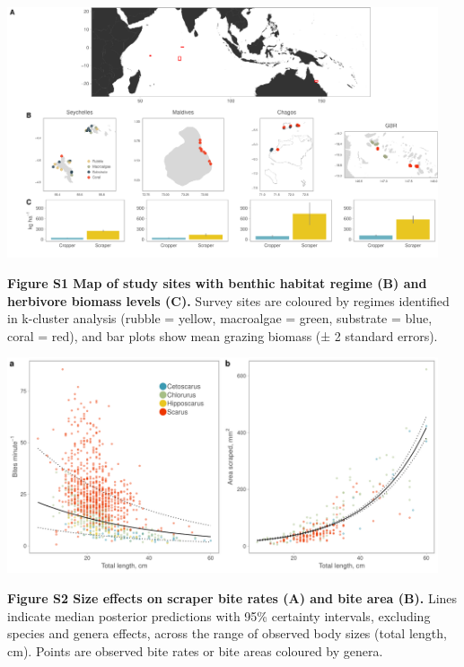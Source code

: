 \documentclass[12pt,]{article}
\begin{document}
~

\begin{center}\includegraphics[width=480px]{../../figures/Figure1} \end{center}

\textbf{Figure S1 \textbar{} Map of study sites with benthic habitat
regime (B) and herbivore biomass levels (C).} Survey sites are coloured
by regimes identified in k-cluster analysis (rubble = yellow, macroalgae
= green, substrate = blue, coral = red), and bar plots show mean grazing
biomass (± 2 standard errors).

\newpage

\begin{center}\includegraphics[width=480px]{../../figures/FigureS1_scrape_size} \end{center}

\textbf{Figure S2 \textbar{} Size effects on scraper bite rates (A) and
bite area (B).} Lines indicate median posterior predictions with 95\%
certainty intervals, excluding species and genera effects, across the
range of observed body sizes (total length, cm). Points are observed
bite rates or bite areas coloured by genera.

\newpage
\end{document}
